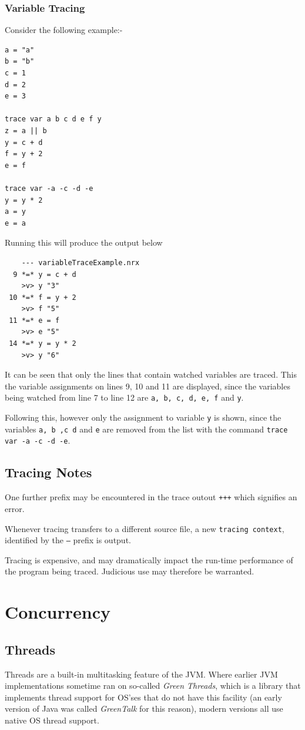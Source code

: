 {\subsection{Variable Tracing}
Consider the following example:-
\begin{lstlisting}[label=Trace2, caption=Trace Example 2]
a = "a"
b = "b"
c = 1
d = 2
e = 3

trace var a b c d e f y
z = a || b
y = c + d
f = y + 2
e = f

trace var -a -c -d -e 
y = y * 2
a = y
e = a
\end{lstlisting}
Running this will produce the output below
\begin{verbatim}
    --- variableTraceExample.nrx 
  9 *=* y = c + d
    >v> y "3" 
 10 *=* f = y + 2
    >v> f "5" 
 11 *=* e = f
    >v> e "5" 
 14 *=* y = y * 2
    >v> y "6" 
\end{verbatim}
It can be seen that only the lines that contain watched variables are traced. This the variable assignments on lines 9, 10 and 11 are displayed, since the variables being watched from line 7 to line 12 are \texttt{a, b, c, d, e, f} and \texttt{y}.

Following this, however only the assignment to variable \texttt{y} is shown, since the variables \texttt{a, b ,c d} and \texttt{e} are removed from the list with the command \mbox{\texttt{trace var -a -c -d -e}}.


\section{Tracing Notes}
One further prefix may be encountered in the trace outout \texttt{+++} which signifies an error.

Whenever tracing transfers to a different source file, a new \texttt{tracing context}, identified by the \texttt{---} prefix is output.

Tracing is expensive, and may dramatically impact the run-time performance of the program being traced. Judicious use may therefore be warranted.

\chapter{Concurrency}
\section{Threads}
Threads are a built-in multitasking feature of the JVM. Where earlier
JVM implementations sometime ran on so-called \emph{Green Threads},
which is a library that implements thread support for OS'ses that do
not have this facility (an
early version of Java was called \emph{GreenTalk} for this reason), modern versions
all use native OS thread support. 

}
